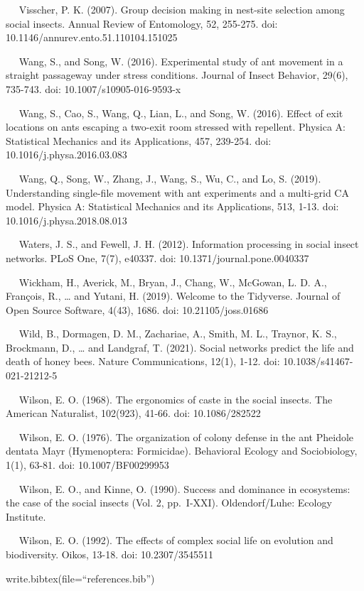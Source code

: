 \documentclass[3p]{elsarticle} %
\begin{document}
~~ Visscher, P. K. (2007). Group decision making in nest-site selection
among social insects. Annual Review of Entomology, 52, 255-275. doi:
10.1146/annurev.ento.51.110104.151025

~~ Wang, S., and Song, W. (2016). Experimental study of ant movement in
a straight passageway under stress conditions. Journal of Insect
Behavior, 29(6), 735-743. doi: 10.1007/s10905-016-9593-x

~~ Wang, S., Cao, S., Wang, Q., Lian, L., and Song, W. (2016). Effect of
exit locations on ants escaping a two-exit room stressed with repellent.
Physica A: Statistical Mechanics and its Applications, 457, 239-254.
doi: 10.1016/j.physa.2016.03.083

~~ Wang, Q., Song, W., Zhang, J., Wang, S., Wu, C., and Lo, S. (2019).
Understanding single-file movement with ant experiments and a multi-grid
CA model. Physica A: Statistical Mechanics and its Applications, 513,
1-13. doi: 10.1016/j.physa.2018.08.013

~~ Waters, J. S., and Fewell, J. H. (2012). Information processing in
social insect networks. PLoS One, 7(7), e40337. doi:
10.1371/journal.pone.0040337

~~ Wickham, H., Averick, M., Bryan, J., Chang, W., McGowan, L. D. A.,
François, R., \ldots{} and Yutani, H. (2019). Welcome to the Tidyverse.
Journal of Open Source Software, 4(43), 1686. doi: 10.21105/joss.01686

~~ Wild, B., Dormagen, D. M., Zachariae, A., Smith, M. L., Traynor, K.
S., Brockmann, D., \ldots{} and Landgraf, T. (2021). Social networks
predict the life and death of honey bees. Nature Communications, 12(1),
1-12. doi: 10.1038/s41467-021-21212-5

~~ Wilson, E. O. (1968). The ergonomics of caste in the social insects.
The American Naturalist, 102(923), 41-66. doi: 10.1086/282522

~~ Wilson, E. O. (1976). The organization of colony defense in the ant
Pheidole dentata Mayr (Hymenoptera: Formicidae). Behavioral Ecology and
Sociobiology, 1(1), 63-81. doi: 10.1007/BF00299953

~~ Wilson, E. O., and Kinne, O. (1990). Success and dominance in
ecosystems: the case of the social insects (Vol. 2, pp.~I-XXI).
Oldendorf/Luhe: Ecology Institute.

~~ Wilson, E. O. (1992). The effects of complex social life on evolution
and biodiversity. Oikos, 13-18. doi: 10.2307/3545511

write.bibtex(file=``references.bib'')
\end{document}
